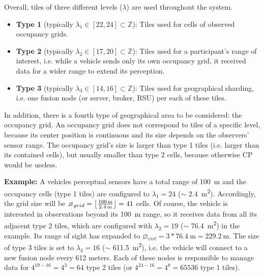 Overall, tiles of three different levels ($\lambda$) are used throughout the system.

\begin{itemize}
	\item \textbf{Type 1} (typically $\lambda_1 \in [22, 24] \subset \mathbb{Z}$): Tiles used for cells of observed occupancy grids.
	\item \textbf{Type 2} (typically $\lambda_2 \in [17, 20] \subset \mathbb{Z}$): Tiles used for a participant's range of interest, i.e. while a vehicle sends only its own occupancy grid, it received data for a wider range to extend its perception.
	\item \textbf{Type 3} (typically $\lambda_3 \in [14, 16] \subset \mathbb{Z}$): Tiles used for geographical sharding, i.e. one fusion node (or server, broker, RSU) per each of these tiles.
\end{itemize}

In addition, there is a fourth type of geographical area to be considered: the occupancy grid. An occupancy grid does not correspond to tiles of a specific level, because its center position is continuous and its size depends on the observers' sensor range. The occupancy grid's size is larger than type 1 tiles (i.e. larger than its contained cells), but usually smaller than type 2 cells, because otherwise CP would be useless. 
\par
\bigskip

\textbf{Example:} A vehicles perceptual sensors have a total range of \SI{100}{\meter} and the occupancy cells (type 1 tiles) are configured to $\lambda_1 = 24$ ($\sim$ \SI{2.4}{\square\meter}). Accordingly, the grid size will be $\diameter_{grid} = \floor*{\frac{\SI{100}{\meter}}{\SI{2.4}{\meter}}} = 41$ cells. Of course, the vehicle is interested in observations beyond its \SI{100}{\meter} range, so it receives data from all its adjacent type 2 tiles, which are configured with $\lambda_2 = 19$ ($\sim$ \SI{76.4}{\square\meter}) in the example. Its range of sight has expanded to $\diameter_{virt} = 3 * \SI{76.4}{\meter} = \SI{229.2}{\meter}$. The size of type 3 tiles is set to $\lambda_3 = 16$ ($\sim$ \SI{611.5}{\square\meter}), i.e. the vehicle will connect to a new fusion node every 612 meters. Each of these nodes is responsible to manage data for $4^{19-16} = 4^3 = 64$ type 2 tiles (or $4^{24-16} = 4^8 = 65536$ type 1 tiles).


